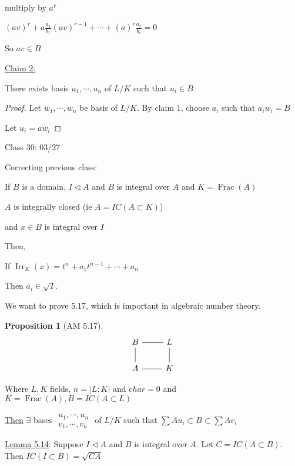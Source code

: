 \documentclass{article}
\theoremstyle{definition}
\newtheorem{proposition}{Proposition}
\newcommand{\Frac}{\operatorname{Frac}}
\begin{document}
multiply by \(a^r\)

\((av)^r + a \frac{a_1}{b_1} (av)^{r-1} + \cdots + (a)^r \frac{a_r}{b_r}=0\)   

So \(av\in B\) 

\underline{Claim 2:}

There exists basis \(u_1,\cdots, u_n\) of \(L / K\) such that \(u_i\in B\) 

\begin{proof}
    Let \(w_1,\cdots,w_n\) be basis of \(L / K\). By claim 1, choose \(a_i\) such that \(a_i w_i = B\) 

    Let \(u_i = aw_i\) 
\end{proof}

\hrulefill

Class 30: 03/27

Correcting previous class:

If \(B\) is a domain, \(I \triangleleft A\) and \(B\) is integral over \(A\) and \(K = \Frac(A)\) 

\(A\) is integrally closed (ie \(A = IC(A \subset K)\))

and \(x\in B\) is integral over \(I\)

Then,

If \(\operatorname{Irr}_K(x)=t^n + a_1 t^{n-1} + \cdots + a_n \)

Then \(a_i \in \sqrt{I}\).

We want to prove 5.17, which is important in algebraic number theory.

\begin{proposition}
    [AM 5.17]

    \[
        \begin{tikzcd}
            B \ar[r, no head] \ar[d, no head] & L\\
            A \ar[r, no head] & K \ar[u, no head]
        \end{tikzcd}
    \]

    Where \(L,K\) fields, \(n = \vert L : K \vert \) and \(char=0\) and \(K =\Frac(A), B=IC(A \subset L)\) 

    \underline{Then} \(\exists\) bases \(\begin{matrix}u_1,\cdots,u_n\\ v_1,\cdots, v_n\end{matrix}\)  of \(L / K\) such that \(\sum A u_i \subset B \subset \sum A v_i\) 
\end{proposition}

\underline{Lemma 5.14}: Suppose \(I \triangleleft A\) and \(B\) is integral over \(A\). Let \(C = IC(A \subset B)\). Then \(IC(I \subset B) = \sqrt{CA} \)   
\end{document}
